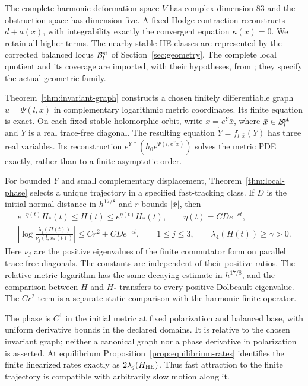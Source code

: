 \documentclass[11pt]{amsart}
\theoremstyle{definition}
\theoremstyle{remark}
\begin{document}
The complete harmonic deformation space $V$ has complex dimension
83 and the obstruction space has dimension five. A fixed Hodge
contraction reconstructs $d+a(x)$, with integrability exactly the
convergent equation $\kappa(x)=0$. We retain all higher terms.
The nearby stable HE classes are represented by the corrected
balanced locus $\mathcal B_l^{\rm st}$ of
Section~\ref{sec:geometry}. The complete local quotient and its
coverage are imported, with their hypotheses, from
\cite{WuebbenWall26}; they specify the actual geometric family.

Theorem~\ref{thm:invariant-graph} constructs a chosen finitely
differentiable graph $u=\Psi(l,x)$ in complementary logarithmic
metric coordinates. Its finite equation is exact. On each fixed
stable holomorphic orbit, write $x=e^Y\bar x$, where
$\bar x\in\mathcal B_l^{\rm st}$ and $Y$ is a real trace-free
diagonal. The resulting equation $\dot Y=f_{l,\bar x}(Y)$ has
three real variables. Its reconstruction
$e^{Y\,*}(h_0e^{\Psi(l,e^Y\bar x)})$ solves the metric PDE
exactly, rather than to a finite asymptotic order.

For bounded $Y$ and small complementary displacement,
Theorem~\ref{thm:local-phase} selects a unique trajectory in a
specified fast-tracking class. If $D$ is the initial normal
distance in $h^{17/8}$ and $r$ bounds $|\bar x|$, then
\begin{equation}\label{eq:intro-tracking}
 \begin{gathered}
 e^{-\eta(t)}H_*(t)\le H(t)\le e^{\eta(t)}H_*(t),
       \qquad \eta(t)=CD e^{-ct},\\
 \left|\log\frac{\lambda_j(H(t))}
                       {\nu_j(l,x_*(t))}\right|
       \le Cr^2+CD e^{-ct},\qquad 1\le j\le3,\qquad
 \lambda_4(H(t))\ge\gamma>0 .
 \end{gathered}
\end{equation}
Here $\nu_j$ are the positive eigenvalues of the finite
commutator form on parallel trace-free diagonals. The constants
are independent of their positive ratios. The relative metric
logarithm has the same decaying estimate in $h^{17/8}$, and
the comparison between $H$ and $H_*$ transfers to every positive
Dolbeault eigenvalue. The $Cr^2$ term is a separate static
comparison with the harmonic finite operator.

The phase is $C^1$ in the initial metric at fixed polarization
and balanced base, with uniform derivative bounds in the
declared domains. It is relative to the chosen invariant graph;
neither a canonical graph nor a phase derivative in polarization
is asserted. At equilibrium
Proposition~\ref{prop:equilibrium-rates} identifies the finite
linearized rates exactly as $2\lambda_j(H_{\rm HE})$.
Thus fast attraction to the finite trajectory is compatible
with arbitrarily slow motion along it.
\end{document}
